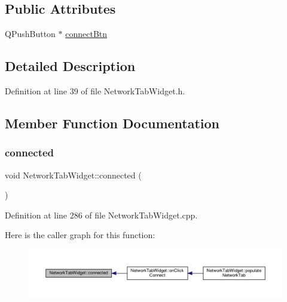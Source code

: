 \subsection*{Public Attributes}
\begin{DoxyCompactItemize}
\item 
Q\+Push\+Button $\ast$ \hyperlink{class_network_tab_widget_a55d24d14f272f78301d0f16a362b7fd4}{connect\+Btn}
\end{DoxyCompactItemize}


\subsection{Detailed Description}


Definition at line 39 of file Network\+Tab\+Widget.\+h.



\subsection{Member Function Documentation}
\mbox{\label{class_network_tab_widget_ac9331d5677a53e58cef3c592e652c9cc}} 
\subsubsection{\texorpdfstring{connected}{connected}}
{\footnotesize\ttfamily void Network\+Tab\+Widget\+::connected (\begin{DoxyParamCaption}{ }\end{DoxyParamCaption})\hspace{0.3cm}{\ttfamily [slot]}}



Definition at line 286 of file Network\+Tab\+Widget.\+cpp.

Here is the caller graph for this function\+:
\nopagebreak
\begin{figure}[H]
\begin{center}
\leavevmode
\includegraphics[width=350pt]{class_network_tab_widget_ac9331d5677a53e58cef3c592e652c9cc_icgraph}
\end{center}
\end{figure}
\mbox{\label{class_network_tab_widget_aaaec9953ba986848054b308177d405cb}} 
